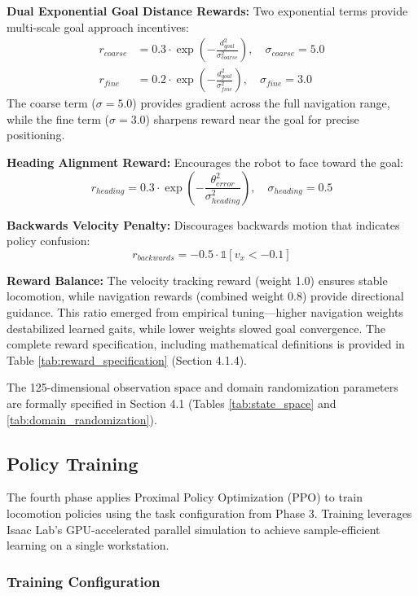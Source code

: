 \documentclass[12pt,a4paper]{article}
\begin{document}
\textbf{Dual Exponential Goal Distance Rewards:} Two exponential terms provide multi-scale goal approach incentives:
\begin{align}
r_{coarse} &= 0.3 \cdot \exp\left(-\frac{d_{goal}^2}{\sigma_{coarse}^2}\right), \quad \sigma_{coarse} = 5.0 \\
r_{fine} &= 0.2 \cdot \exp\left(-\frac{d_{goal}^2}{\sigma_{fine}^2}\right), \quad \sigma_{fine} = 3.0
\end{align}
The coarse term ($\sigma = 5.0$) provides gradient across the full navigation range, while the fine term ($\sigma = 3.0$) sharpens reward near the goal for precise positioning.

\textbf{Heading Alignment Reward:} Encourages the robot to face toward the goal:
\begin{equation}
r_{heading} = 0.3 \cdot \exp\left(-\frac{\theta_{error}^2}{\sigma_{heading}^2}\right), \quad \sigma_{heading} = 0.5
\end{equation}

\textbf{Backwards Velocity Penalty:} Discourages backwards motion that indicates policy confusion:
\begin{equation}
r_{backwards} = -0.5 \cdot \mathbb{1}[v_x < -0.1]
\end{equation}

\textbf{Reward Balance:} The velocity tracking reward (weight 1.0) ensures stable locomotion, while navigation rewards (combined weight 0.8) provide directional guidance. This ratio emerged from empirical tuning---higher navigation weights destabilized learned gaits, while lower weights slowed goal convergence. The complete reward specification, including mathematical definitions is provided in Table \ref{tab:reward_specification} (Section 4.1.4).

The 125-dimensional observation space and domain randomization parameters are formally specified in Section 4.1 (Tables \ref{tab:state_space} and \ref{tab:domain_randomization}).

\subsection{Policy Training}

The fourth phase applies Proximal Policy Optimization (PPO) to train locomotion policies using the task configuration from Phase 3. Training leverages Isaac Lab's GPU-accelerated parallel simulation to achieve sample-efficient learning on a single workstation.

\subsubsection{Training Configuration}
\end{document}
